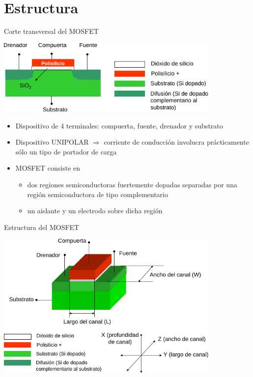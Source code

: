 \documentclass[t,aspectratio=169,10pt]{beamer}
\begin{document}
\section{Estructura}
\begin{frame}{Corte transversal del MOSFET}

\centering
\includegraphics[width=11cm]{transistor1}

\raggedright
\begin{itemize}
	\item Dispositivo de 4 terminales: compuerta, fuente, drenador y substrato
	\item Dispositivo UNIPOLAR $\Rightarrow$ corriente de conducción involucra prácticamente sólo un tipo de portador de carga
	\item MOSFET consiste en
	\begin{itemize}
		\item dos regiones semiconductoras fuertemente dopadas separadas por una región semiconductora de tipo complementario
		\item un aislante y un electrodo sobre dicha región
	\end{itemize}
\end{itemize}

\end{frame}

\begin{frame}{Estructura del MOSFET}

\centering
\includegraphics[width=11cm]{transistor2}

\end{frame}
\end{document}
